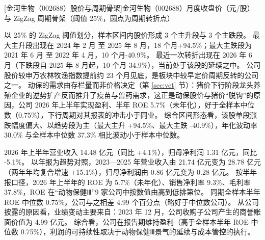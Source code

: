 \begin{center}
\begin{minipage}{\textwidth}\centering
{}

[金河生物（002688）股价与周期骨架]{金河生物（002688）月度收盘价（元/股）与 ZigZag 周期骨架（阈值 25\%，圆点为周期转折点）}
\end{minipage}
\end{center}

 以 25\% 的 ZigZag 阈值划分，样本区间内股价形成 3 个主升段与 3 个主跌段。 最大主升段出现在 2024 年 2 月 至 2025 年 8 月，18 个月+94.5\%；最大主跌段为 2021 年 6 月 至 2022 年 4 月，10 个月-40.9\%。 最近一次转折出现在 2026 年 6 月（下跌段自 2025 年 8 月起，10 个月-34.9\%），当前处于该段的延续之中。 公司股价较申万农林牧渔指数提前约 23 个月见底，是板块中较早定价周期反转的公司之一。 动保的需求由存栏量而非价格决定（第 \ref{sec:vet} 节）：猪价下行阶段龙头养殖企业的逆势扩产反而推升了疫苗与兽药需求，这正是动保股价与猪价“脱钩”的原因，公司 2026 年上半年实现盈利、半年 ROE 5.7\%（未年化），好于全样本中位数（0.75\%），下行周期对其报表的冲击小于同业。 综合区间形态看，该股单段涨跌幅度偏大、以趋势段为主（最大主升 +94.5\%、最大主跌 -40.9\%），年化波动率 30.0\% 与全样本中位数 37.3\% 相比波动小于样本中位数。

 2026 年上半年营业收入 14.48 亿元（同比 +4.1\%），归母净利润 1.31 亿元，同比 -5.1\%。 以年报为趋势对照，2023---2025 年营业收入由 21.74 亿元变为 28.78 亿元（两年年均复合增速 +15.1\%），归母净利润由 0.86 亿元变为 0.28 亿元。 按半年报口径，2026 年上半年的 ROE 为 5.7\%（未年化）、销售净利率 9.3\%、毛利率 37.8\%，ROE 在“动物保健Ⅲ”9 家公司中按数值由高到低排第位。 同期全样本半年 ROE 中位数 0.75\%，公司与之相差 4.99 个百分点（略好于中位数公司）。 从公司披露的原因看，业绩变动主要来自：2023 年 12 月，公司收购子公司产生的商誉账面价值为 4.99 亿元。 综合看，公司在报告期维持盈利（高于全样本半年 ROE 中位数 0.75\%），利润的可持续性取决于动物保健Ⅲ景气的延续与成本管控的执行。

